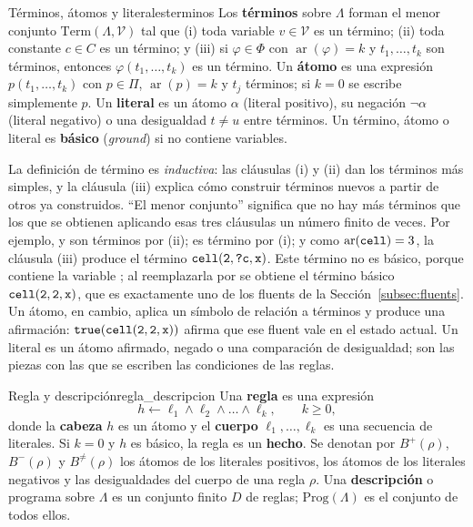\begin{definicion}{Términos, átomos y literales}{terminos}
Los \textbf{términos} sobre $\Lambda$ forman el menor conjunto $\mathrm{Term}(\Lambda, \mathcal V)$ tal que (i) toda variable $v \in \mathcal V$ es un término; (ii) toda constante $c \in C$ es un término; y (iii) si $\varphi \in \Phi$ con $\operatorname{ar}(\varphi) = k$ y $t_1, \dots, t_k$ son términos, entonces $\varphi(t_1, \dots, t_k)$ es un término. Un \textbf{átomo} es una expresión $p(t_1, \dots, t_k)$ con $p \in \Pi$, $\operatorname{ar}(p) = k$ y $t_j$ términos; si $k = 0$ se escribe simplemente $p$. Un \textbf{literal} es un átomo $\alpha$ (literal positivo), su negación $\neg\alpha$ (literal negativo) o una desigualdad $t \neq u$ entre términos. Un término, átomo o literal es \textbf{básico} (\textit{ground}) si no contiene variables.
\end{definicion}

La definición de término es \emph{inductiva}: las cláusulas (i) y (ii) dan los términos más simples, y la cláusula (iii) explica cómo construir términos nuevos a partir de otros ya construidos. ``El menor conjunto'' significa que no hay más términos que los que se obtienen aplicando esas tres cláusulas un número finito de veces. Por ejemplo,  y  son términos por (ii);  es término por (i); y como $\operatorname{ar}(\texttt{cell}) = 3$, la cláusula (iii) produce el término $\texttt{cell}(\texttt{2}, \texttt{?c}, \texttt{x})$. Este término no es básico, porque contiene la variable ; al reemplazarla por  se obtiene el término básico $\texttt{cell}(\texttt{2}, \texttt{2}, \texttt{x})$, que es exactamente uno de los fluents de la Sección~\ref{subsec:fluents}. Un átomo, en cambio, aplica un símbolo de relación a términos y produce una afirmación: $\texttt{true}(\texttt{cell}(\texttt{2}, \texttt{2}, \texttt{x}))$ afirma que ese fluent vale en el estado actual. Un literal es un átomo afirmado, negado o una comparación de desigualdad; son las piezas con las que se escriben las condiciones de las reglas.

\begin{definicion}{Regla y descripción}{regla_descripcion}
Una \textbf{regla} es una expresión
\begin{equation}
    h \leftarrow \ell_1 \land \ell_2 \land \dots \land \ell_k , \qquad k \ge 0,
    \label{eq:an_regla}
\end{equation}
donde la \textbf{cabeza} $h$ es un átomo y el \textbf{cuerpo} $\ell_1, \dots, \ell_k$ es una secuencia de literales. Si $k = 0$ y $h$ es básico, la regla es un \textbf{hecho}. Se denotan por $B^+(\rho)$, $B^-(\rho)$ y $B^{\neq}(\rho)$ los átomos de los literales positivos, los átomos de los literales negativos y las desigualdades del cuerpo de una regla $\rho$. Una \textbf{descripción} o programa sobre $\Lambda$ es un conjunto finito $D$ de reglas; $\mathrm{Prog}(\Lambda)$ es el conjunto de todos ellos.
\end{definicion}

